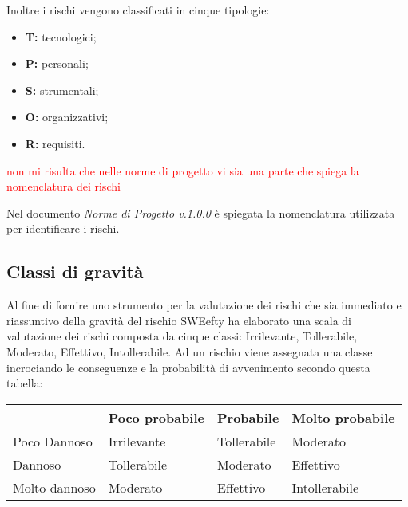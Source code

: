 Inoltre i rischi vengono classificati in cinque tipologie:
\begin{itemize}
	\item \textbf{T:} tecnologici;
	\item \textbf{P:} personali;
	\item \textbf{S:} strumentali;
	\item \textbf{O:} organizzativi;
	\item \textbf{R:} requisiti.
\end{itemize}


\textcolor{red}{non mi risulta che nelle norme di progetto vi sia una parte che spiega la nomenclatura dei rischi}


Nel documento \emph{Norme di Progetto v.1.0.0} è spiegata la nomenclatura utilizzata per identificare i rischi.

\subsection{Classi di gravità}
Al fine di fornire uno strumento per la valutazione dei rischi che sia immediato e riassuntivo della gravità del rischio SWEefty ha elaborato una scala di valutazione dei rischi composta da cinque classi: Irrilevante, Tollerabile, Moderato, Effettivo, Intollerabile. Ad un rischio viene assegnata una classe incrociando le conseguenze e la probabilità di avvenimento secondo questa tabella:
\begin{table}[H]
	\centering
	\begin{tabular}{|C{3cm}|C{3cm}|C{3cm}|C{3cm}|}
		\hline
		~             & Poco probabile & Probabile   & Molto probabile \\ \hline
		Poco Dannoso  & Irrilevante    & Tollerabile & Moderato        \\ \hline
		Dannoso       & Tollerabile    & Moderato    & Effettivo       \\ \hline
		Molto dannoso & Moderato       & Effettivo   & Intollerabile   \\
		\hline
	\end{tabular}
\end{table}

